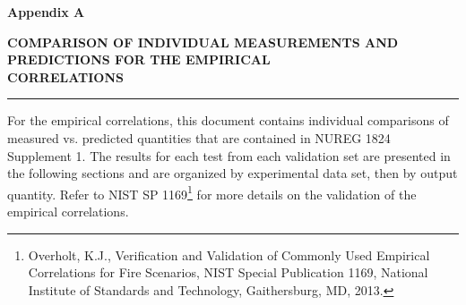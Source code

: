 \documentclass[12pt, titlepage, twoside]{article}
\begin{document}
\thispagestyle{empty}

\huge
\noindent \textbf{Appendix A}

\vspace{0.5em}
\LARGE
\noindent \textbf{COMPARISON OF INDIVIDUAL MEASUREMENTS AND PREDICTIONS FOR THE EMPIRICAL \\ CORRELATIONS}

\normalsize

\vspace{1.5em}
\hrule
\vspace{1.0em}

For the empirical correlations, this document contains individual comparisons of measured vs. predicted quantities that are contained in NUREG 1824 Supplement 1. The results for each test from each validation set are presented in the following sections and are organized by experimental data set, then by output quantity. Refer to NIST SP 1169\footnote{Overholt, K.J., Verification and Validation of Commonly Used Empirical Correlations for Fire Scenarios, NIST Special Publication 1169, National Institute of Standards and Technology, Gaithersburg, MD, 2013.} for more details on the validation of the empirical correlations.

\clearpage
{}
\thispagestyle{empty}
\tableofcontents

\appendix


\end{document}
